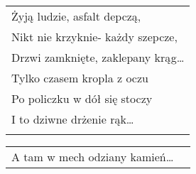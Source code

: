 \documentclass[a5paper]{article}
\begin{document}
\noindent
\begin{tabular}{@{}p{9.5cm}@{}}
Żyją ludzie, asfalt depczą, \\
Nikt nie krzyknie- każdy szepcze, \\
Drzwi zamknięte, zaklepany krąg… \\
Tylko czasem kropla z oczu \\
Po policzku w dół się stoczy \\
I to dziwne drżenie rąk… \\ \\
\end{tabular}

\noindent
\begin{tabular}{@{}p{8.5cm}p{3cm}@{}}
A tam w mech odziany kamień…
\end{tabular}
\end{document}
